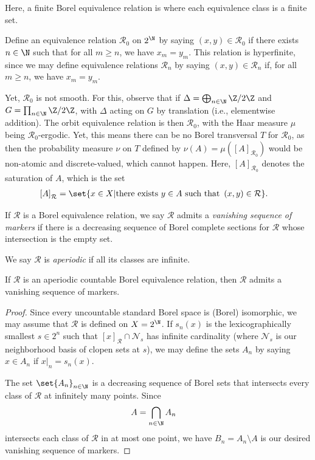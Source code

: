 \documentclass[10pt]{mypackage}
\begin{document}
Here, a finite Borel equivalence relation is where each equivalence class is a finite set.
\begin{example}
  Define an equivalence relation $\mathcal{R}_0$ on $2^{\N}$ by saying $\left( x,y \right)\in \mathcal{R}_0$ if there exists $n\in \N$ such that for all $m\geq n$, we have $x_m = y_m$. This relation is hyperfinite, since we may define equivalence relations $\mathcal{R}_n$ by saying $\left( x,y \right)\in \mathcal{R}_n$ if, for all $m\geq n$, we have $x_m = y_m$.

  Yet, $\mathcal{R}_0$ is not smooth. For this, observe that if $\Delta = \bigoplus_{n\in \N}\Z/2\Z$ and $G = \prod_{n\in \N}\Z/2\Z$, with $\Delta$ acting on $G$ by translation (i.e., elementwise addition). The orbit equivalence relation is then $\mathcal{R}_0$, with the Haar measure $\mu$ being $\mathcal{R}_0$-ergodic. Yet, this means there can be no Borel transversal $T$ for $\mathcal{R}_0$, as then the probability measure $\nu$ on $T$ defined by $\nu\left( A \right) = \mu\left( \left[ A \right]_{\mathcal{R}_0} \right)$ would be non-atomic and discrete-valued, which cannot happen. Here, $\left[ A \right]_{\mathcal{R}_0}$ denotes the saturation of $A$, which is the set
  \begin{align*}
    \left[ A \right]_{\mathcal{R}} &= \set{x\in X | \text{there exists }y\in A\text{ such that }\left( x,y \right)\in \mathcal{R}}.
  \end{align*}
\end{example}
\begin{definition}
  If $\mathcal{R}$ is a Borel equivalence relation, we say $\mathcal{R}$ admits a \textit{vanishing sequence of markers} if there is a decreasing sequence of Borel complete sections for $\mathcal{R}$ whose intersection is the empty set.

  We say $\mathcal{R}$ is \textit{aperiodic} if all its classes are infinite.
\end{definition}
\begin{lemma}
  If $\mathcal{R}$ is an aperiodic countable Borel equivalence relation, then $\mathcal{R}$ admits a vanishing sequence of markers.
\end{lemma}
\begin{proof}
  Since every uncountable standard Borel space is (Borel) isomorphic, we may assume that $\mathcal{R}$ is defined on $X = 2^{\N}$. If $s_n(x)$ is the lexicographically smallest $s\in 2^{n}$ such that $\left[ x \right]_{\mathcal{R}}\cap \mathcal{N}_s$ has infinite cardinality (where $\mathcal{N}_s$ is our neighborhood basis of clopen sets at $s$), we may define the sets $A_n$ by saying $x\in A_n$ if $x|_{n} = s_n(x)$.

  The set $\set{A_n}_{n\in \N}$ is a decreasing sequence of Borel sets that intersects every class of $\mathcal{R}$ at infinitely many points. Since
  \begin{align*}
    A &= \bigcap_{n\in \N} A_n
  \end{align*}
  intersects each class of $\mathcal{R}$ in at most one point, we have $B_n = A_n \setminus A$ is our desired vanishing sequence of markers.
\end{proof}
\end{document}

